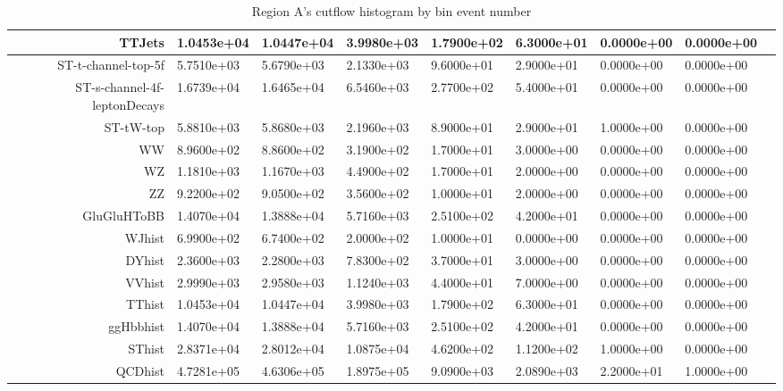 \begin{landscape}
\begin{table}[htb]
\begin{tabular}{rllllllll}
 \hline 
TTJets&1.0453e+04&1.0447e+04&3.9980e+03&1.7900e+02&6.3000e+01&0.0000e+00&0.0000e+00\\
 \hline 
ST-t-channel-top-5f&5.7510e+03&5.6790e+03&2.1330e+03&9.6000e+01&2.9000e+01&0.0000e+00&0.0000e+00\\
 \hline 
ST-s-channel-4f-leptonDecays&1.6739e+04&1.6465e+04&6.5460e+03&2.7700e+02&5.4000e+01&0.0000e+00&0.0000e+00\\
 \hline 
ST-tW-top&5.8810e+03&5.8680e+03&2.1960e+03&8.9000e+01&2.9000e+01&1.0000e+00&0.0000e+00\\
 \hline 
WW&8.9600e+02&8.8600e+02&3.1900e+02&1.7000e+01&3.0000e+00&0.0000e+00&0.0000e+00\\
 \hline 
WZ&1.1810e+03&1.1670e+03&4.4900e+02&1.7000e+01&2.0000e+00&0.0000e+00&0.0000e+00\\
 \hline 
ZZ&9.2200e+02&9.0500e+02&3.5600e+02&1.0000e+01&2.0000e+00&0.0000e+00&0.0000e+00\\
 \hline 
GluGluHToBB&1.4070e+04&1.3888e+04&5.7160e+03&2.5100e+02&4.2000e+01&0.0000e+00&0.0000e+00\\
 \hline 
WJhist&6.9900e+02&6.7400e+02&2.0000e+02&1.0000e+01&0.0000e+00&0.0000e+00&0.0000e+00\\
 \hline 
DYhist&2.3600e+03&2.2800e+03&7.8300e+02&3.7000e+01&3.0000e+00&0.0000e+00&0.0000e+00\\
 \hline 
VVhist&2.9990e+03&2.9580e+03&1.1240e+03&4.4000e+01&7.0000e+00&0.0000e+00&0.0000e+00\\
 \hline 
TThist&1.0453e+04&1.0447e+04&3.9980e+03&1.7900e+02&6.3000e+01&0.0000e+00&0.0000e+00\\
 \hline 
ggHbbhist&1.4070e+04&1.3888e+04&5.7160e+03&2.5100e+02&4.2000e+01&0.0000e+00&0.0000e+00\\
 \hline 
SThist&2.8371e+04&2.8012e+04&1.0875e+04&4.6200e+02&1.1200e+02&1.0000e+00&0.0000e+00\\
 \hline 
QCDhist&4.7281e+05&4.6306e+05&1.8975e+05&9.0900e+03&2.0890e+03&2.2000e+01&1.0000e+00\\
\end{tabular}
\label{tab:Unitcutfl}
\centering
\caption{Region A's cutflow histogram by bin event number}
\end{table}
\end{landscape}







